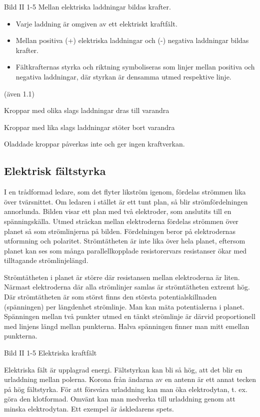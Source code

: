 Bild II 1-5
Mellan elektriska laddningar bildas krafter.

\begin{itemize}
\item Varje laddning är omgiven av ett elektriskt kraftfält.
\item Mellan positiva (+) elektriska laddningar
och (-) negativa laddningar bildas krafter.
\item Fältkrafternas styrka och riktning symboliseras som linjer mellan positiva och
negativa laddningar, där styrkan är densamma utmed respektive linje.
\end{itemize}

(även 1.1)

Kroppar med olika slags laddningar dras
till varandra

Kroppar med lika slags laddningar stöter bort varandra

Oladdade kroppar påverkas inte och ger ingen kraftverkan.

\subsection{Elektrisk fältstyrka}

I en trådformad ledare, som det flyter likström igenom, fördelas strömmen lika över
tvärsnittet. Om ledaren i stället är ett tunt plan, så blir strömfördelningen annorlunda.
Bilden visar ett plan med två elektroder, som anslutits till en spänningskälla. Utmed
sträckan mellan elektroderna fördelas strömmen över planet så som strömlinjerna på bilden.
Fördelningen beror på elektrodernas utformning och polaritet. Strömtätheten är inte lika
över hela planet, eftersom planet kan ses som många parallellkopplade resistorervars
resistanser ökar med tilltagande strömlinjelängd.

Strömtätheten i planet är större där resistansen mellan elektroderna är liten. Närmast
elektroderna där alla strömlinjer samlas är strömtätheten extremt hög. Där strömtätheten
är som störst finns den största potentialskillnaden (spänningen) per längdenhet
strömlinje. Man kan mäta potentialerna i planet. Spänningen mellan två punkter utmed en
tänkt strömlinje är därvid proportionell med linjens längd mellan punkterna. Halva
spänningen finner man mitt emellan punkterna.

Bild II 1-5 Elektriska kraftfält

Elektriska fält är upplagrad energi. Fältstyrkan kan bli så hög, att det blir en
urladdning mellan polerna. Korona från ändarna av en antenn är ett annat tecken på hög
fältstyrka. För att försvåra urladdning kan man öka elektrodytan, t. ex. göra den
klotformad. Omvänt kan man medverka till urladdning genom att minska elektrodytan.
Ett exempel är åskledarens spets.

